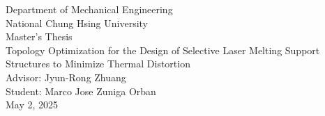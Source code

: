 \documentclass[../main.tex]{subfiles}
\begin{document}
	
	\thispagestyle{empty}
  \begin{center}
    \vspace{0.5cm}

    \LARGE 
    Department of Mechanical Engineering \\
    National Chung Hsing University \\
    Master's Thesis \\
    \vspace{3cm}
    Topology Optimization for the Design of Selective Laser Melting Support Structures to Minimize Thermal Distortion\\
    \vspace{3cm}
    Advisor: Jyun-Rong Zhuang \\
    Student: Marco Jose Zuniga Orban \\
    \vspace{3cm}
    May 2, 2025 \\
   
  \end{center}
\end{document}
